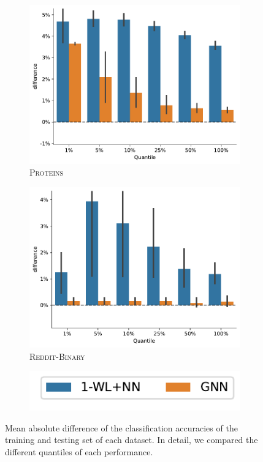 \begin{figure}[H]
\begin{subfigure}[b]{0.3\textwidth}
		\includegraphics[width=\textwidth]{Figures/train_test_diff_PROTEINS.pdf}
		\vspace*{-4ex} 
		\caption{\textsc{Proteins}}
	\end{subfigure}
	\hfill
	\begin{subfigure}[b]{0.3\textwidth}
		\centering
		\includegraphics[width=\textwidth]{Figures/train_test_diff_REDDIT-BINARY.pdf}
		\vspace*{-4ex} 
		\caption{\textsc{Reddit-Binary}}
	\end{subfigure}
	\centering
	\begin{subfigure}[b]{0.3\textwidth}
		\centering
		\includegraphics[width=\textwidth]{Figures/train_test_diff_legend.pdf}
		\vspace*{-4ex} 
	\end{subfigure}
	\caption{Mean absolute difference of the classification accuracies of the training and testing set of each dataset. In detail, we compared the different quantiles of each performance.}
\end{figure}

